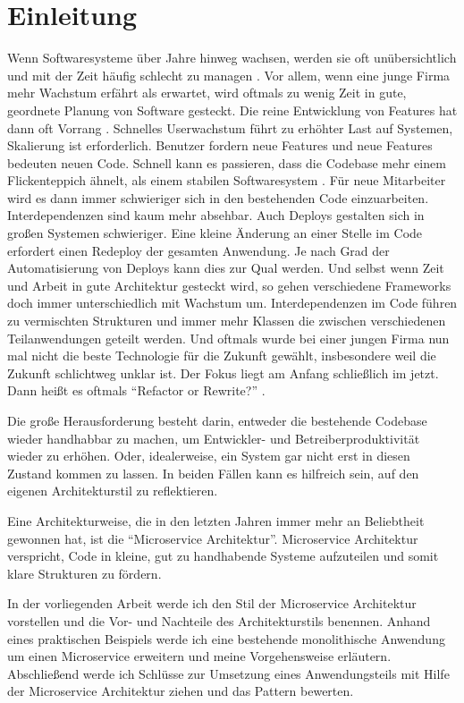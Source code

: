 \chapter{Einleitung}
Wenn Softwaresysteme über Jahre hinweg wachsen, werden sie oft unübersichtlich und mit der Zeit häufig schlecht zu managen \cite{infaktuell}. Vor allem, wenn eine junge Firma mehr Wachstum erfährt als erwartet, wird oftmals zu wenig Zeit in gute, geordnete Planung von Software gesteckt. Die reine Entwicklung von Features hat dann oft Vorrang \cite{mckinsey}. Schnelles Userwachstum führt zu erhöhter Last auf Systemen, Skalierung ist erforderlich. Benutzer fordern neue Features und neue Features bedeuten neuen Code. Schnell kann es passieren, dass die Codebase mehr einem Flickenteppich ähnelt, als einem stabilen Softwaresystem \cite[vgl.][Seite 7]{highsmith2013adaptive}. Für neue Mitarbeiter wird es dann immer schwieriger sich in den bestehenden Code einzuarbeiten. Interdependenzen sind kaum mehr absehbar. Auch Deploys gestalten sich in großen Systemen schwieriger. Eine kleine Änderung an einer Stelle im Code erfordert einen Redeploy der gesamten Anwendung. Je nach Grad der Automatisierung von Deploys kann dies zur Qual werden. Und selbst wenn Zeit und Arbeit in gute Architektur gesteckt wird, so gehen verschiedene Frameworks doch immer unterschiedlich mit Wachstum um. Interdependenzen im Code führen zu vermischten Strukturen und immer mehr Klassen die zwischen verschiedenen Teilanwendungen geteilt werden. Und oftmals wurde bei einer jungen Firma nun mal nicht die beste Technologie für die Zukunft gewählt, insbesondere weil die Zukunft schlichtweg unklar ist. Der Fokus liegt am Anfang schließlich im jetzt. Dann heißt es oftmals ``Refactor or Rewrite?'' \cite[vgl.][]{refactorrewrite}.

Die große Herausforderung besteht darin, entweder die bestehende Codebase wieder handhabbar zu machen, um Entwickler- und Betreiberproduktivität wieder zu erhöhen. Oder, idealerweise, ein System gar nicht erst in diesen Zustand kommen zu lassen. In beiden Fällen kann es hilfreich sein, auf den eigenen Architekturstil zu reflektieren.

Eine Architekturweise, die in den letzten Jahren immer mehr an Beliebtheit gewonnen hat, ist die ``Microservice Architektur''. Microservice Architektur verspricht, Code in kleine, gut zu handhabende Systeme aufzuteilen und somit klare Strukturen zu fördern.

In der vorliegenden Arbeit werde ich den Stil der Microservice Architektur vorstellen und die Vor- und Nachteile des Architekturstils benennen. Anhand eines praktischen Beispiels werde ich eine bestehende monolithische Anwendung um einen Microservice erweitern und meine Vorgehensweise erläutern.
Abschließend werde ich Schlüsse zur Umsetzung eines Anwendungsteils mit Hilfe der Microservice Architektur ziehen und das Pattern bewerten.